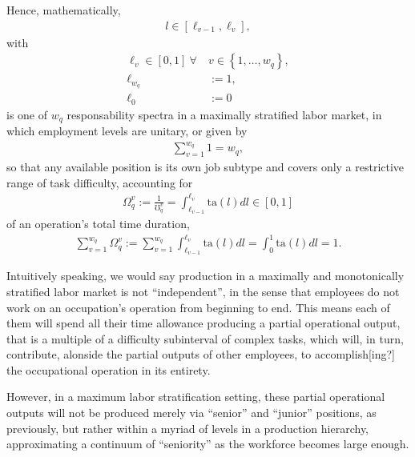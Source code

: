 \documentclass[hidelinks, nonatbib]{elsarticle}
\begin{document}
\begin{definition}
    \label{mmls_def}
    Hence, mathematically,
    \begin{gather}
    l \in \left[
    \ell_{v-1}
    ,
    \ell_{v}
    \right]
    ,
    \end{gather}
    with
    \begin{align}
    \ell_{v} \in [0,1]
    \
    \forall
    \
    &v \in 
    \left\{
        1, \dots, w_q
    \right\}
    ,
    \\
    \ell_{w_q} &:= 1
    ,
    \\
    \ell_0 &:= 0
    \end{align}
    is one of $w_q$ responsability spectra in a maximally stratified labor market, in which employment levels are unitary, or given by
    \begin{gather}
    \sum_{v=1}^{w_q}
    1
    =
    w_q
    ,
    \end{gather}
    so that any available position is its own job subtype and covers only a restrictive range of task difficulty, accounting for
    \begin{gather}
    \Omega_{q}^{v} := 
    \frac{1}{\mho_{q}^{v}} = 
    \int_{
        \ell_{v-1}
    }^{
        \ell_{v}
    }
    \text{ta}(l)dl
    \in [0,1]
    \end{gather}
    of an operation's total time duration,
    \begin{gather}
    \sum_{v=1}^{w_q}
    \Omega_{q}^{v} 
    := 
    \sum_{v=1}^{w_q}
    \int_{
        \ell_{v-1}
    }^{
        \ell_{v}
    }
    \text{ta}(l)dl
    =
    \int_{0}^{1}
    \text{ta}(l)dl
    =
    1
    .
    \end{gather}
    
    Intuitively speaking, we would say production in a maximally and monotonically stratified labor market is not ``independent'', in the sense that employees do not work on an occupation's operation from beginning to end. This means each of them will spend all their time allowance producing a partial operational output, that is a multiple of a difficulty subinterval of complex tasks, which will, in turn, contribute, alonside the partial outputs of other employees, to accomplish[ing?] the occupational operation in its entirety.
    
    However, in a maximum labor stratification setting, these partial operational outputs will not be produced merely via ``senior'' and ``junior'' positions, as previously, but rather within a myriad of levels in a production hierarchy, approximating a continuum of ``seniority'' as the workforce becomes large enough.
    

\end{definition}
\end{document}
